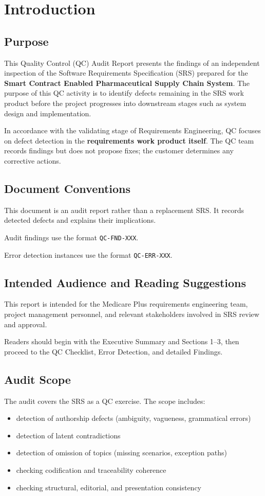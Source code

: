 \documentclass[11pt,a4paper]{article}
\begin{document}
\section{Introduction}

\subsection{Purpose}
This Quality Control (QC) Audit Report presents the findings of an independent inspection of the Software Requirements Specification (SRS) prepared for the \textbf{Smart Contract Enabled Pharmaceutical Supply Chain System}. The purpose of this QC activity is to identify defects remaining in the SRS work product before the project progresses into downstream stages such as system design and implementation.

In accordance with the validating stage of Requirements Engineering, QC focuses on defect detection in the \textbf{requirements work product itself}. The QC team records findings but does not propose fixes; the customer determines any corrective actions.

\subsection{Document Conventions}
This document is an audit report rather than a replacement SRS. It records detected defects and explains their implications.

Audit findings use the format \texttt{QC-FND-XXX}.

Error detection instances use the format \texttt{QC-ERR-XXX}.

\subsection{Intended Audience and Reading Suggestions}
This report is intended for the Medicare Plus requirements engineering team, project management personnel, and relevant stakeholders involved in SRS review and approval.

Readers should begin with the Executive Summary and Sections 1--3, then proceed to the QC Checklist, Error Detection, and detailed Findings.

\subsection{Audit Scope}
The audit covers the SRS as a QC exercise. The scope includes:
\begin{itemize}[leftmargin=*]
\item detection of authorship defects (ambiguity, vagueness, grammatical errors)
\item detection of latent contradictions
\item detection of omission of topics (missing scenarios, exception paths)
\item checking codification and traceability coherence
\item checking structural, editorial, and presentation consistency
\end{itemize}
\end{document}
